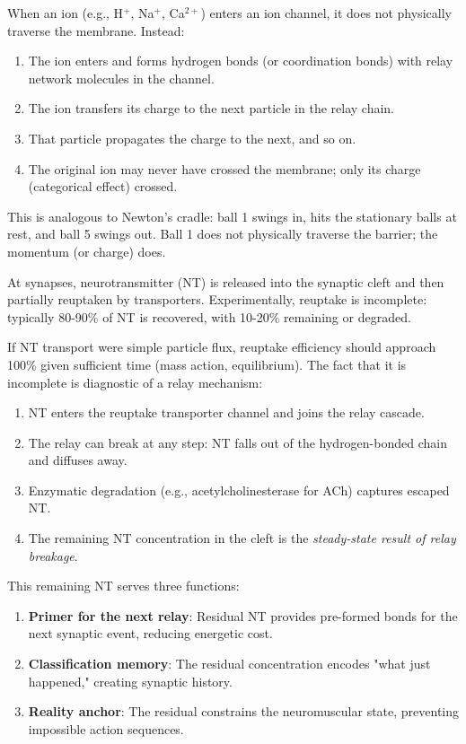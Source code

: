 \begin{principle}
\label{prin:newtons-cradle}
When an ion (e.g., H$^+$, Na$^+$, Ca$^{2+}$) enters an ion channel, it does not physically traverse the membrane. Instead:
\begin{enumerate}[label=(\roman*), noitemsep]
\item The ion enters and forms hydrogen bonds (or coordination bonds) with relay network molecules in the channel.
\item The ion transfers its charge to the next particle in the relay chain.
\item That particle propagates the charge to the next, and so on.
\item The original ion may never have crossed the membrane; only its charge (categorical effect) crossed.
\end{enumerate}

This is analogous to Newton's cradle: ball 1 swings in, hits the stationary balls at rest, and ball 5 swings out. Ball 1 does not physically traverse the barrier; the momentum (or charge) does.
\end{principle}

\begin{theorem}
\label{thm:reuptake-incomplete}
At synapses, neurotransmitter (NT) is released into the synaptic cleft and then partially reuptaken by transporters. Experimentally, reuptake is incomplete: typically 80-90\% of NT is recovered, with 10-20\% remaining or degraded.

If NT transport were simple particle flux, reuptake efficiency should approach 100\% given sufficient time (mass action, equilibrium). The fact that it is incomplete is diagnostic of a relay mechanism:

\begin{enumerate}[label=(\roman*), noitemsep]
\item NT enters the reuptake transporter channel and joins the relay cascade.
\item The relay can break at any step: NT falls out of the hydrogen-bonded chain and diffuses away.
\item Enzymatic degradation (e.g., acetylcholinesterase for ACh) captures escaped NT.
\item The remaining NT concentration in the cleft is the \emph{steady-state result of relay breakage}.
\end{enumerate}

This remaining NT serves three functions:
\begin{enumerate}[label=(\arabic*), noitemsep]
\item \textbf{Primer for the next relay}: Residual NT provides pre-formed bonds for the next synaptic event, reducing energetic cost.
\item \textbf{Classification memory}: The residual concentration encodes "what just happened," creating synaptic history.
\item \textbf{Reality anchor}: The residual constrains the neuromuscular state, preventing impossible action sequences.
\end{enumerate}
\end{theorem}

